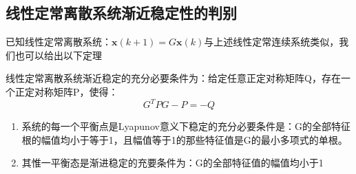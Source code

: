 \subsection{线性定常离散系统渐近稳定性的判别}

已知线性定常离散系统：$\bm{x}(k+1) = G \bm{x}(k)$与上述线性定常连续系统类似，我们也可以给出以下定理
\begin{theorem}
    线性定常离散系统渐近稳定的充分必要条件为：给定任意正定对称矩阵Q，存在一个正定对称矩阵P，使得：
    \begin{equation*}
        G^T P G - P = -Q 
    \end{equation*}
\end{theorem}

\begin{theorem}
    \begin{enumerate}
        \item 系统的每一个平衡点是Lyapunov意义下稳定的充分必要条件是：G的全部特征根的幅值均小于等于1，且幅值等于1的那些特征值是G的最小多项式的单根。
        \item 其惟一平衡态是渐进稳定的充要条件为：G的全部特征值的幅值均小于1
    \end{enumerate}
\end{theorem}
